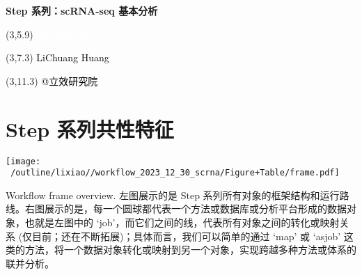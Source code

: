 \documentclass[
]{article}
\author{}
\date{\vspace{-2.5em}}
\begin{document}
\begin{titlepage} 
\begin{center} \textbf{\Huge Step 系列：scRNA-seq
基本分析} \vspace{4em}
\begin{textblock}{10}(3,5.9) \huge
\textbf{\textcolor{white}{2024-02-06}}
\end{textblock} \begin{textblock}{10}(3,7.3)
\Large \textcolor{black}{LiChuang Huang}
\end{textblock} \begin{textblock}{10}(3,11.3)
\Large \textcolor{black}{@立效研究院}
\end{textblock} \end{center} \end{titlepage}
\restoregeometry


\tableofcontents

\listoffigures

\listoftables

\newpage


\hypertarget{step}{%
\section{Step 系列共性特征}\label{step}}



\def\@captype{figure}
\begin{center}
\texttt{[image: ~/outline/lixiao//workflow\_2023\_12\_30\_scrna/Figure+Table/frame.pdf]}
\caption{Workflow frame overview. 左图展示的是 Step 系列所有对象的框架结构和运行路线。右图展示的是，每一个圆球都代表一个方法或数据库或分析平台形成的数据对象，也就是左图中的 `job'，而它们之间的线，代表所有对象之间的转化或映射关系 (仅目前；还在不断拓展)；具体而言，我们可以简单的通过 `map' 或 `asjob' 这类的方法，将一个数据对象转化或映射到另一个对象，实现跨越多种方法或体系的联并分析。}\label{fig:Workflow frame overview. 左图展示的是 Step 系列所有对象的框架结构和运行路线。右图展示的是，每一个圆球都代表一个方法或数据库或分析平台形成的数据对象，也就是左图中的 `job'，而它们之间的线，代表所有对象之间的转化或映射关系 (仅目前；还在不断拓展)；具体而言，我们可以简单的通过 `map' 或 `asjob' 这类的方法，将一个数据对象转化或映射到另一个对象，实现跨越多种方法或体系的联并分析。}
\end{center}
\end{document}
